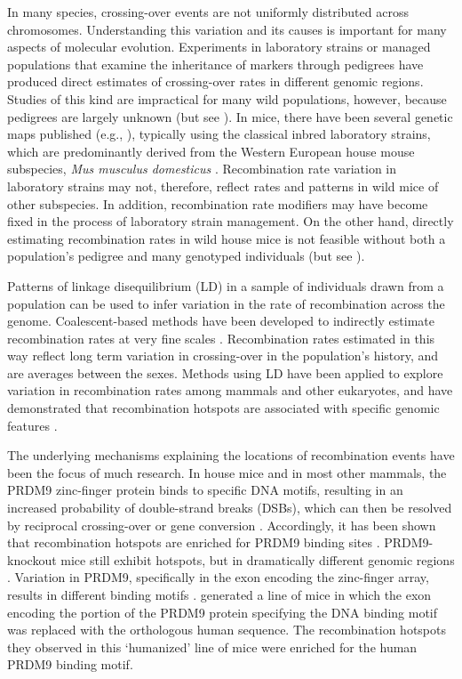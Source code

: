 In many species, crossing-over events are not uniformly distributed across chromosomes. Understanding this variation and its causes is important for many aspects of molecular evolution. Experiments in laboratory strains or managed populations that examine the inheritance of markers through pedigrees have produced direct estimates of crossing-over rates in different genomic regions. Studies of this kind are impractical for many wild populations, however, because pedigrees are largely unknown (but see \citealt{RN250}). In mice, there have been several genetic maps published (e.g., \citealt{RN183,RN263,RN232,RN266}), typically using the classical inbred laboratory strains, which are predominantly derived from the Western European house mouse subspecies, \textit{Mus musculus domesticus} \citep{RN243}. Recombination rate variation in laboratory strains may not, therefore, reflect rates and patterns in wild mice of other subspecies. In addition, recombination rate modifiers may have become fixed in the process of laboratory strain management. On the other hand, directly estimating recombination rates in wild house mice is not feasible without both a population’s pedigree and many genotyped individuals (but see \citealt{RN267}). 
 
        	Patterns of linkage disequilibrium (LD) in a sample of individuals drawn from a population can be used to infer variation in the rate of recombination across the genome. Coalescent-based methods have been developed to indirectly estimate recombination rates at very fine scales \citep{RN261, RN182, RN257, RN260, RN213}. Recombination rates estimated in this way reflect long term variation in crossing-over in the population’s history, and are averages between the sexes. Methods using LD have been applied to explore variation in recombination rates among mammals and other eukaryotes, and have demonstrated that recombination hotspots are associated with specific genomic features \citep{RN246, RN247, RN258}.

The underlying mechanisms explaining the locations of recombination events have been the focus of much research. In house mice and in most other mammals, the PRDM9 zinc-finger protein binds to specific DNA motifs, resulting in an increased probability of double-strand breaks (DSBs), which can then be resolved by reciprocal crossing-over or gene conversion \citep{RN245, RN256}. Accordingly, it has been shown that recombination hotspots are enriched for PRDM9 binding sites \citep{RN262, RN156}. PRDM9-knockout mice still exhibit hotspots, but in dramatically different genomic regions \citep{RN254}. Variation in PRDM9, specifically in the exon encoding the zinc-finger array, results in different binding motifs \citep{RN269}. \cite{RN246} generated a line of mice in which the exon encoding the portion of the PRDM9 protein specifying the DNA binding motif was replaced with the orthologous human sequence. The recombination hotspots they observed in this ‘humanized’ line of mice were enriched for the human PRDM9 binding motif. 

